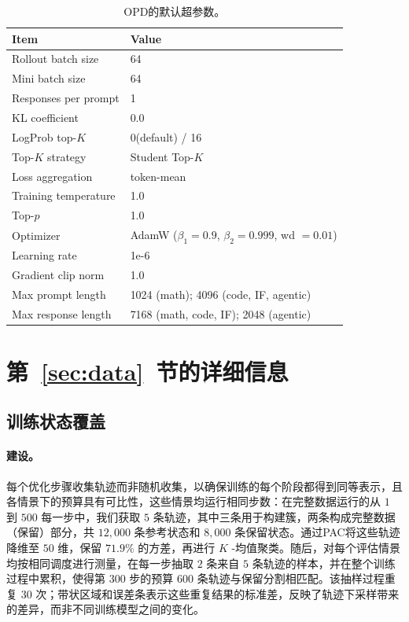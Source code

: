 \begin{table}[t]
\centering
\caption{OPD的默认超参数。}
\label{tab:opd-hyperparams}
\small
\begin{tabular}{ll}
\toprule
\textbf{Item} & \textbf{Value} \\
\midrule
Rollout batch size      & 64 \\
Mini batch size         & 64 \\
Responses per prompt    & 1 \\
KL coefficient          & 0.0 \\
LogProb top-$K$         & 0(default) / 16 \\
Top-$K$ strategy        & Student Top-$K$ \\
Loss aggregation        & token-mean \\
Training temperature    & 1.0 \\
Top-$p$                 & 1.0 \\
Optimizer               & AdamW ($\beta_1{=}0.9$, $\beta_2{=}0.999$, wd $=0.01$) \\
Learning rate           & 1e-6 \\
Gradient clip norm      & 1.0 \\
Max prompt length       & 1024 (math); 4096 (code, IF, agentic) \\
Max response length     & 7168 (math, code, IF); 2048 (agentic) \\
\bottomrule
\end{tabular}
\end{table}


\section{第~\ref{sec:data}~节的详细信息}

\subsection{训练状态覆盖}
\label{app:state-coverage}
\label{app:state-coverage-robustness}

\paragraph{建设。}
每个优化步骤收集轨迹而非随机收集，以确保训练的每个阶段都得到同等表示，且各情景下的预算具有可比性，这些情景均运行相同步数：在完整数据运行的从 \(1\) 到 \(500\) 每一步中，我们获取 \(5\) 条轨迹，其中三条用于构建簇，两条构成完整数据（保留）部分，共 \(12{,}000\) 条参考状态和 \(8{,}000\) 条保留状态。通过PAC将这些轨迹降维至 \(50\) 维，保留 \(71.9\%\) 的方差，再进行 \(K\) -均值聚类。随后，对每个评估情景均按相同调度进行测量，在每一步抽取 \(2\) 条来自 \(5\) 条轨迹的样本，并在整个训练过程中累积，使得第 \(300\) 步的预算 \(600\) 条轨迹与保留分割相匹配。该抽样过程重复 \(30\) 次；带状区域和误差条表示这些重复结果的标准差，反映了轨迹下采样带来的差异，而非不同训练模型之间的变化。


